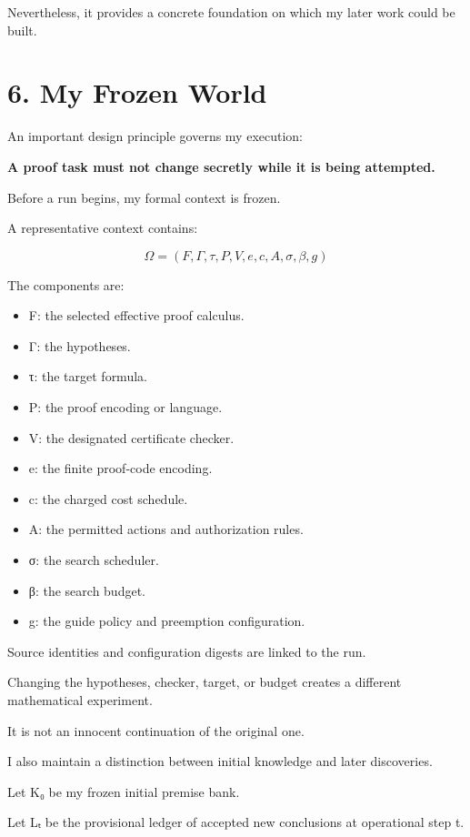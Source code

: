 \documentclass[11pt,letterpaper]{article}
\providecommand{\tightlist}{\setlength{\itemsep}{0pt}\setlength{\parskip}{0pt}}
\begin{document}
Nevertheless, it provides a concrete foundation on which my later work could be built.

\section{6. My Frozen World}\label{my-frozen-world}

An important design principle governs my execution:

\textbf{A proof task must not change secretly while it is being attempted.}

Before a run begins, my formal context is frozen.

A representative context contains:

\[\Omega=(F,\Gamma,\tau,P,V,e,c,A,\sigma,\beta,g)\]

The components are:

\begin{itemize}
\tightlist
\item
  F: the selected effective proof calculus.
\item
  Γ: the hypotheses.
\item
  τ: the target formula.
\item
  P: the proof encoding or language.
\item
  V: the designated certificate checker.
\item
  e: the finite proof-code encoding.
\item
  c: the charged cost schedule.
\item
  A: the permitted actions and authorization rules.
\item
  σ: the search scheduler.
\item
  β: the search budget.
\item
  g: the guide policy and preemption configuration.
\end{itemize}

Source identities and configuration digests are linked to the run.

Changing the hypotheses, checker, target, or budget creates a different mathematical experiment.

It is not an innocent continuation of the original one.

I also maintain a distinction between initial knowledge and later discoveries.

Let K₀ be my frozen initial premise bank.

Let Lₜ be the provisional ledger of accepted new conclusions at operational step t.
\end{document}
